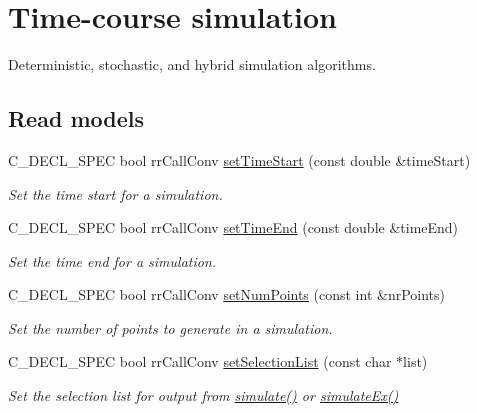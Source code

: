 \hypertarget{group__simulation}{
\section{\-Time-\/course simulation}
\label{group__simulation}
}


\-Deterministic, stochastic, and hybrid simulation algorithms.  


\subsection*{\-Read models}
\begin{DoxyCompactItemize}
\item 
\-C\-\_\-\-D\-E\-C\-L\-\_\-\-S\-P\-E\-C bool rr\-Call\-Conv \hyperlink{group__loadsave_ga1a636a76ad610d99fe1c780bb3d9296d}{set\-Time\-Start} (const double \&time\-Start)
\begin{DoxyCompactList}\small\item\em \-Set the time start for a simulation. \end{DoxyCompactList}\item 
\-C\-\_\-\-D\-E\-C\-L\-\_\-\-S\-P\-E\-C bool rr\-Call\-Conv \hyperlink{group__loadsave_ga1313e21d622cd846bdd75071e965eb6c}{set\-Time\-End} (const double \&time\-End)
\begin{DoxyCompactList}\small\item\em \-Set the time end for a simulation. \end{DoxyCompactList}\item 
\-C\-\_\-\-D\-E\-C\-L\-\_\-\-S\-P\-E\-C bool rr\-Call\-Conv \hyperlink{group__loadsave_ga448ead53bb8913de664cc8ad675b4197}{set\-Num\-Points} (const int \&nr\-Points)
\begin{DoxyCompactList}\small\item\em \-Set the number of points to generate in a simulation. \end{DoxyCompactList}\item 
\-C\-\_\-\-D\-E\-C\-L\-\_\-\-S\-P\-E\-C bool rr\-Call\-Conv \hyperlink{group__loadsave_ga6465c94b6dfed39a6ef614bd0a68cb9b}{set\-Selection\-List} (const char $\ast$list)
\begin{DoxyCompactList}\small\item\em \-Set the selection list for output from \hyperlink{group__simulation_ga9f0555c11716daec2336d54d13facc57}{simulate()} or \hyperlink{group__simulation_ga9b87919e79f6eb0d7c77c3daa08d6baf}{simulate\-Ex()} \end{DoxyCompactList}\item 

\end{DoxyCompactItemize}

